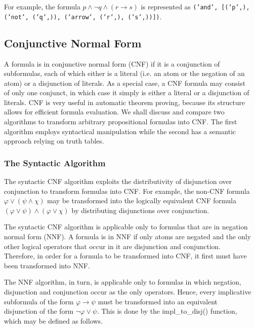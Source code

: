 \documentclass[a4paper,notitlepage]{scrartcl}
\let\phi\varphi
\begin{document}
\noindent
For example, the formula $p \land \lnot q \land (r \to s)$ is represented as
\texttt{('and', [('p',), ('not', ('q',)), ('arrow', ('r',), ('s',))])}.


\subsection{Conjunctive Normal Form}

A formula is in conjunctive normal form (CNF) if it is a conjunction of
subformulas, each of which either is a literal (i.e. an atom or the negation of
an atom) or a disjunction of literals.
As a special case, a CNF formula may consist of only one conjunct, in which
case it simply is either a literal or a disjunction of literals. 
CNF is very useful in automatic theorem proving, because its structure allows
for efficient formula evaluation.
We shall discuss and compare two algorithms to transform arbitrary
propositional formulas into CNF.
The first algorithm employs syntactical manipulation while the second has a
semantic approach relying on truth tables.

\subsubsection{The Syntactic Algorithm}

The syntactic CNF algorithm exploits the distributivity of disjunction over
conjunction to transform formulas into CNF.
For example, the non-CNF formula $\phi \lor (\psi \land \chi)$ may be
transformed into the logically equivalent CNF formula $(\phi \lor \psi) \land
(\phi \lor \chi)$ by distributing disjunctions over conjunction.

The syntactic CNF algorithm is applicable only to formulas that are in negation
normal form (NNF).
A formula is in NNF if only atoms are negated and the only other logical
operators that occur in it are disjunction and conjunction.
Therefore, in order for a formula to be transformed into CNF, it first must
have been transformed into NNF.

The NNF algorithm, in turn, is applicable only to formulas in which negation,
disjunction and conjunction occur as the only operators.
Hence, every implicative subformula of the form $\phi \to \psi$ must be
transformed into an equivalent disjunction of the form $\lnot\phi \lor \psi$.
This is done by the impl\_to\_disj() function, which may be defined as follows.
\end{document}
